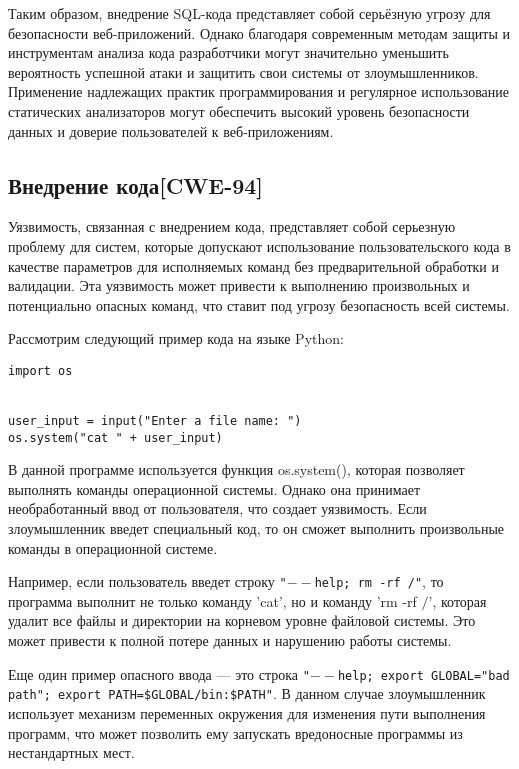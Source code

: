 \documentclass[a4paper,12pt]{article} %
\begin{document}
			\par Таким образом, внедрение SQL-кода представляет собой серьёзную угрозу для безопасности веб-приложений. Однако благодаря современным методам защиты и инструментам анализа кода разработчики могут значительно уменьшить вероятность успешной атаки и защитить свои системы от злоумышленников. Применение надлежащих практик программирования и регулярное использование статических анализаторов могут обеспечить высокий уровень безопасности данных и доверие пользователей к веб-приложениям.

		\subsection{Внедрение кода[CWE-94]}
			Уязвимость, связанная с внедрением кода, представляет собой серьезную проблему для систем, которые допускают использование пользовательского кода в качестве параметров для исполняемых команд без предварительной обработки и валидации. Эта уязвимость может привести к выполнению произвольных и потенциально опасных команд, что ставит под угрозу безопасность всей системы.

			\par Рассмотрим следующий пример кода на языке Python:

			\begin{lstlisting}[style=pythonstyle]
import os


user_input = input("Enter a file name: ")
os.system("cat " + user_input)
        	\end{lstlisting}

			\par В данной программе используется функция os.system(), которая позволяет выполнять команды операционной системы. Однако она принимает необработанный ввод от пользователя, что создает уязвимость. Если злоумышленник введет специальный код, то он сможет выполнить произвольные команды в операционной системе.

			\par Например, если пользователь введет строку \texttt{"$--$help; rm -rf /"}, то программа выполнит не только команду 'cat', но и команду 'rm -rf $/$', которая удалит все файлы и директории на корневом уровне файловой системы. Это может привести к полной потере данных и нарушению работы системы.

			\par Еще один пример опасного ввода — это строка \texttt{"$--$help; export GLOBAL="bad path"; export PATH=\$GLOBAL/bin:\$PATH"}. В данном случае злоумышленник использует механизм переменных окружения для изменения пути выполнения программ, что может позволить ему запускать вредоносные программы из нестандартных мест.
\end{document}
